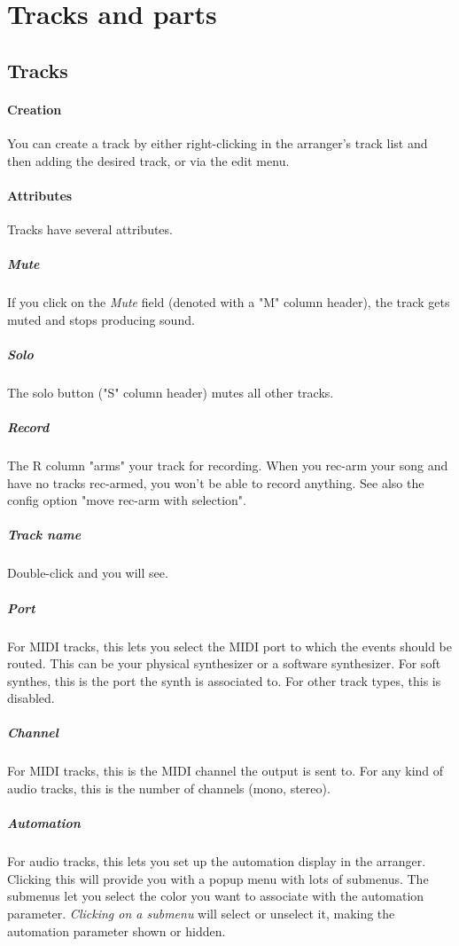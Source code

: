 \documentclass[a4paper]{report}
\begin{document}
\section{Tracks and parts}
\subsection{Tracks}
\paragraph{Creation}
You can create a track by either right-clicking in the arranger's track   %
list and then adding the desired track, or via the edit menu.

\paragraph{Attributes}                                                    %
Tracks have several attributes.
\subparagraph{Mute} If you click on the \emph{Mute} field (denoted with
a "M" column header), the track gets muted and stops producing sound.
\subparagraph{Solo} The solo button ("S" column header) mutes all other   %
tracks.
\subparagraph{Record} The R column "arms" your track for recording.
When you rec-arm your song and have no tracks rec-armed, you won't be
able to record anything. See also the config option "move rec-arm with    %
selection".
\subparagraph{Track name} Double-click and you will see.
\subparagraph{Port} For MIDI tracks, this lets you select the MIDI
port to which the events should be routed. This can be your physical
synthesizer or a software synthesizer. For soft synthes, this is the
port the synth is associated to. For other track types, this is disabled.
\subparagraph{Channel} For MIDI tracks, this is the MIDI channel the
output is sent to. For any kind of audio tracks, this is the number of
channels (mono, stereo).
\subparagraph{Automation} For audio tracks, this lets you set up the
automation display in the arranger. Clicking this will provide you with
a popup menu with lots of submenus. The submenus let you select the
color you want to associate with the automation parameter. \emph{Clicking %
on a submenu} will select or unselect it, making the automation parameter %
shown or hidden.
\end{document}
